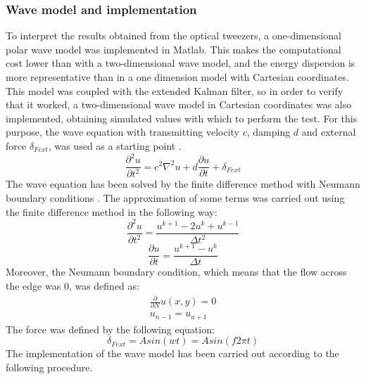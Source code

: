 \documentclass[12pt, a4paper]{article} %
\begin{document}
	\subsubsection{Wave model and implementation}
	
	To interpret the results obtained from the optical tweezers, a one-dimensional polar wave model was implemented in Matlab. This makes the computational cost lower than with a two-dimensional wave model, and the energy dispersion is more representative than in a one dimension model with Cartesian coordinates. This model was coupled with the extended Kalman filter, so in order to verify that it worked, a two-dimensional wave model in Cartesian coordinates was also implemented, obtaining simulated values with which to perform the test. For this purpose, the wave equation with transmitting velocity $c$, damping $d$ and external force $\delta_{Fext}$, was used as a starting point \cite{achenbach2012wave, d'alembert_1749}.
	\setlength{\parskip}{4mm}
	\begin{equation} \label{eqn:wave_model}
		\frac{\partial^{2}u}{\partial t^{2}} = c^{2}\nabla^{2}u + d\frac{\partial u}{\partial t} + \delta_{Fext}
	\end{equation}
	The wave equation has been solved by the finite difference method \cite{petter2017finite} with Neumann boundary conditions \cite{mathews2000metodos}. The approximation of some terms was carried out using the finite difference method in the following way:
	\begin{equation} \label{eqn:deltau_deltat2}
		\frac{\partial^{2}u}{\partial t^{2}} = \frac{u^{k + 1} - 2u^{k} + u^{k - 1}}{\Delta t^{2}} 
	\end{equation}
	\begin{equation} \label{eqn:deltau_deltat}
		\frac{\partial u}{\partial t} = \frac{u^{k + 1} - u^{k}}{\Delta t}
	\end{equation}
	Moreover, the Neumann boundary condition, which means that the flow across the edge was 0, was defined as:
	\begin{equation} \label{eqn:neumann}
		\begin{array}{ l }
			\frac{\partial}{\partial N} u(x, y) = 0\\
			u_{n-1} = u_{u+1}
		\end{array}
	\end{equation}
	The force was defined by the following equation:
	\begin{equation} \label{eqn:force}
		\delta_{Fext} = Asin(wt) = Asin(f2\pi t)
	\end{equation}
	The implementation of the wave model has been carried out according to the following procedure.
	
\end{document}
